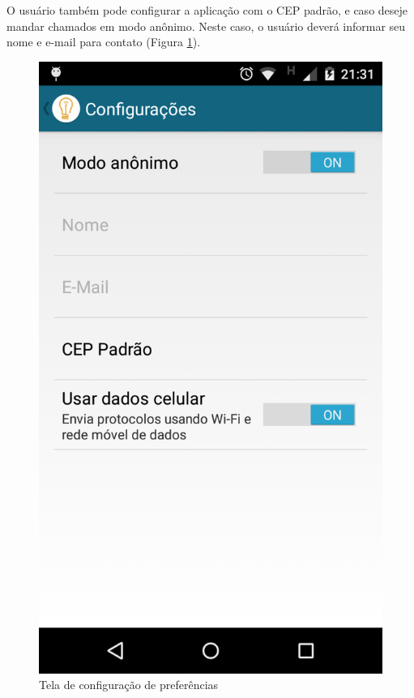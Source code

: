 \documentclass[
	article,			%
	11pt,				%
	oneside,			%
	a4paper,			%
	english,			%
	brazil,				%
	sumario=tradicional
	]{abntex2}
\begin{document}
O usuário também pode configurar a aplicação com o CEP padrão, e caso deseje mandar chamados em modo anônimo. Neste caso, o usuário deverá informar seu nome e e-mail para contato (Figura \ref{android-tela-preferencias}).

\begin{figure}[!htbp]
 \centering
  \begin{minipage}{0.4\textwidth}
    \centering
    \caption{\label{android-tela-preferencias}Tela de configuração de preferências}
    \includegraphics[scale=0.1]{android/9.png}
  \end{minipage}
\end{figure}
\end{document}
